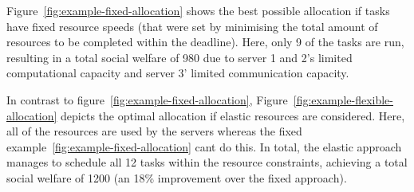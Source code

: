 Figure~\ref{fig:example-fixed-allocation} shows the best possible allocation if tasks have fixed resource speeds (that
were set by minimising the total amount of resources to be completed within the deadline). Here, only 9 of the tasks
are run, resulting in a total social welfare of 980 due to server 1 and 2's limited computational capacity and server
3' limited communication capacity.

In contrast to figure~\ref{fig:example-fixed-allocation}, Figure~\ref{fig:example-flexible-allocation} depicts the optimal
allocation if elastic resources are considered. Here, all of the resources are used by the servers whereas the fixed
example~\ref{fig:example-fixed-allocation} cant do this. In total, the elastic approach manages to schedule all 12 tasks
within the resource constraints, achieving a total social welfare of 1200 (an 18\% improvement over the fixed approach).
